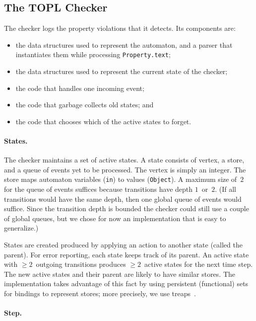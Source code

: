 \documentclass[9pt, preprint]{sigplanconf} %
\theoremstyle{definition}
\theoremstyle{remark}
\begin{document}
\subsection{The TOPL Checker} %

The checker logs the property violations that it detects.
Its components are:
\begin{itemize}
\item the data structures used to represent the automaton, and a parser that instantiates them while processing {\tt Property.text};
\item the data structures used to represent the current state of the checker;
\item the code that handles one incoming event;
\item the code that garbage collects old states; and
\item the code that chooses which of the active states to forget.
\end{itemize}

\paragraph{States.}
The checker maintains a set of active states.
A state consists of vertex, a store, and a queue of events yet to be processed.
The vertex is simply an integer.
The store maps automaton variables ({\tt in}) to values ({\tt Object}).
A maximum size of~$2$ for the queue of events suffices because transitions have depth $1$~or~$2$.
(If all transitions would have the same depth, then one global queue of events would suffice.
Since the transition depth is bounded the checker could still use a couple of global queues, but we chose for now an implementation that is easy to generalize.)

States are created produced by applying an action to another state (called the parent).
For error reporting, each state keeps track of its parent.
An active state with $\ge2$~outgoing transitions produces $\ge2$~active states for the next time step.
The new active states and their parent are likely to have similar stores.
The implementation takes advantage of this fact by using persistent (functional) sets for bindings to represent stores; more precisely, we use treaps~\cite{DBLP:conf/focs/AragonS89}.

\paragraph{Step.}
\end{document}

